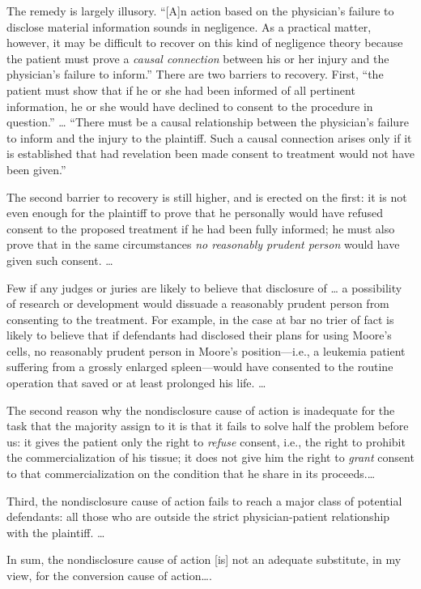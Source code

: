 The remedy is largely illusory. ``[A]n action based on the physician's failure
to disclose material information sounds in negligence. As a practical matter,
however, it may be difficult to recover on this kind of negligence theory
because the patient must prove a \textit{causal connection} between his or her
injury and the physician's failure to inform.'' There are two barriers to
recovery. First, ``the patient must show that if he or she had been informed of
all pertinent information, he or she would have declined to consent to the
procedure in question.'' {\dots} ``There must be a causal relationship between
the physician's failure to inform and the injury to the plaintiff. Such a
causal connection arises only if it is established that had revelation been
made consent to treatment would not have been given.''

The second barrier to recovery is still higher, and is erected on the first: it
is not even enough for the plaintiff to prove that he personally would have
refused consent to the proposed treatment if he had been fully informed; he
must also prove that in the same circumstances \textit{no reasonably prudent
person} would have given such consent. {\dots}

Few if any judges or juries are likely to believe that disclosure of {\dots} a
possibility of research or development would dissuade a reasonably prudent
person from consenting to the treatment. For example, in the case at bar no
trier of fact is likely to believe that if defendants had disclosed their plans
for using Moore's cells, no reasonably prudent person in Moore's
position---i.e., a leukemia patient suffering from a grossly enlarged
spleen---would have
consented to the routine operation that saved or at least prolonged his life.
{\dots}

The second reason why the nondisclosure cause of action is inadequate for the
task that the majority assign to it is that it fails to solve half the problem
before us: it gives the patient only the right to \textit{refuse} consent,
i.e., the right to prohibit the commercialization of his tissue; it does not
give him the right to \textit{grant} consent to that commercialization on the
condition that he share in its proceeds.{\dots}

Third, the nondisclosure cause of action fails to reach a major class of
potential defendants: all those who are outside the strict physician-patient
relationship with the plaintiff. {\dots}

In sum, the nondisclosure cause of action [is] not an adequate substitute, in my
view, for the conversion cause of action{\dots}.

